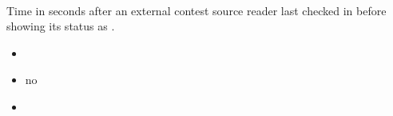 \documentclass[a4paper,10pt,english,openany]{sphinxmanual}
\begin{document}
\paragraph{}
\label{\detokenize{configuration-reference:external-contest-source-critical}}
\sphinxAtStartPar
Time in seconds after an external contest source reader last checked in before showing its status as .
\begin{itemize}
\item {} 
\sphinxAtStartPar
{} 

\item {} 
\sphinxAtStartPar
{} no

\item {} 
\sphinxAtStartPar
{} 

\end{itemize}



\renewcommand{\indexname}{Index}
\printindex
\end{document}
